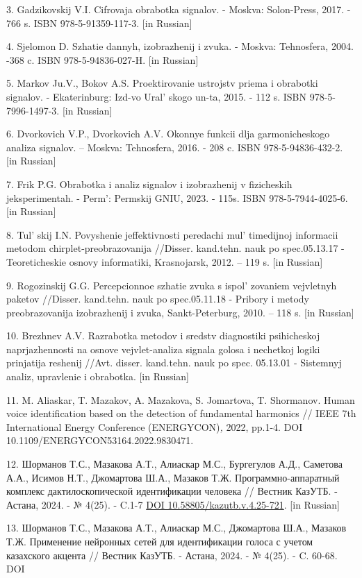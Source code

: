 3. Gadzikovskij V.I. Cifrovaja obrabotka signalov. - Moskva: Solon-Press,
2017. - 766 s. ISBN 978-5-91359-117-3. {[}in Russian{]}

4. Sjelomon D. Szhatie dannyh, izobrazhenij i zvuka. - Moskva:
Tehnosfera, 2004. -368 c. ISBN 978-5-94836-027-H. {[}in Russian{]}

5. Markov Ju.V., Bokov A.S. Proektirovanie ustrojstv priema i obrabotki
signalov. - Ekaterinburg: Izd-vo Ural' skogo un-ta, 2015.
- 112 s. ISBN 978-5-7996-1497-3. {[}in Russian{]}

6. Dvorkovich V.P., Dvorkovich A.V. Okonnye funkcii dlja garmonicheskogo
analiza signalov. -- Moskva: Tehnosfera, 2016. - 208 c. ISBN
978-5-94836-432-2. {[}in Russian{]}

7. Frik P.G. Obrabotka i analiz signalov i izobrazhenij v fizicheskih
jeksperimentah. - Perm': Permskij GNIU, 2023. - 115s.
ISBN 978-5-7944-4025-6. {[}in Russian{]}

8. Tul' skij I.N. Povyshenie jeffektivnosti peredachi
mul' timedijnoj informacii metodom
chirplet-preobrazovanija //Disser. kand.tehn. nauk po spec.05.13.17 -
Teoreticheskie osnovy informatiki, Krasnojarsk, 2012. -- 119 s. {[}in
Russian{]}

9. Rogozinskij G.G. Percepcionnoe szhatie zvuka s
ispol' zovaniem vejvletnyh paketov //Disser. kand.tehn.
nauk po spec.05.11.18 - Pribory i metody preobrazovanija izobrazhenij i
zvuka, Sankt-Peterburg, 2010. -- 118 s. {[}in Russian{]}

10. Brezhnev A.V. Razrabotka metodov i sredstv diagnostiki psihicheskoj
naprjazhennosti na osnove vejvlet-analiza signala golosa i nechetkoj
logiki prinjatija reshenij //Avt. disser. kand.tehn. nauk po spec.
05.13.01 - Sistemnyj analiz, upravlenie i obrabotka. {[}in Russian{]}

11. M. Aliaskar, T. Mazakov, A. Mazakova, S. Jomartova, T. Shormanov.
Human voice identification based on the detection of fundamental
harmonics // IEEE 7th International Energy Conference
(ENERGYCON)\emph{,} 2022, pp.1-4. DOI
10.1109/ENERGYCON53164.2022.9830471.

12. Шорманов Т.С., Мазакова А.Т., Алиаскар М.С., Бургегулов А.Д.,
Саметова А.А., Исимов Н.Т., Джомартова Ш.А., Мазаков Т.Ж.
Программно-аппаратный комплекс дактилоскопической идентификации человека
// Вестник КазУТБ. - Астана, 2024. - № 4(25). - C.1-7
\href{https://doi.org/10.58805/kazutb.v.4.25-721}{DOI
10.58805/kazutb.v.4.25-721}. {[}in Russian{]}

13. Шорманов Т.С., Мазакова А.Т., Алиаскар М.С., Джомартова Ш.А., Мазаков
Т.Ж. Применение нейронных сетей для идентификации голоса с учетом
казахского акцента // Вестник КазУТБ. - Астана, 2024. - № 4(25). - C.
60-68. DOI

